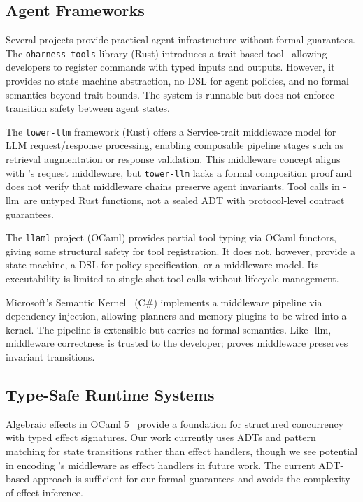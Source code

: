 \subsection{Agent Frameworks}
\label{ssec:frameworks}

Several projects provide practical agent infrastructure without formal guarantees.
The \texttt{oharness\_tools} library (Rust) introduces a trait-based tool \ADT\
allowing developers to register commands with typed inputs and outputs. However, it
provides no state machine abstraction, no DSL for agent policies, and no formal
semantics beyond trait bounds. The system is runnable but does not enforce transition
safety between agent states.

The \texttt{tower-llm} framework (Rust) offers a Service-trait middleware model for
LLM request/response processing, enabling composable pipeline stages such as
retrieval augmentation or response validation. This middleware concept aligns with
\PAR's request middleware, but \texttt{tower-llm} lacks a formal composition proof
and does not verify that middleware chains preserve agent invariants. Tool calls in
\tower-llm\ are untyped Rust functions, not a sealed ADT with protocol-level
contract guarantees.

The \texttt{llaml} project (OCaml) provides partial tool typing via OCaml functors,
giving some structural safety for tool registration. It does not, however, provide a
state machine, a DSL for policy specification, or a middleware model. Its
executability is limited to single-shot tool calls without lifecycle management.

Microsoft's Semantic Kernel~\cite{semantic-kernel} (C\#) implements a middleware
pipeline via dependency injection, allowing planners and memory plugins to be wired
into a kernel. The pipeline is extensible but carries no formal semantics. Like
\tower-llm, middleware correctness is trusted to the developer; \PAR proves
middleware preserves invariant transitions.

\subsection{Type-Safe Runtime Systems}
\label{ssec:type-safe-runtimes}

Algebraic effects in OCaml 5~\cite{algebraic-effects-ocaml} provide a foundation for
structured concurrency with typed effect signatures. Our work currently uses ADTs
and pattern matching for state transitions rather than effect handlers, though we see
potential in encoding \PAR's middleware as effect handlers in future work. The
current ADT-based approach is sufficient for our formal guarantees and avoids the
complexity of effect inference.

